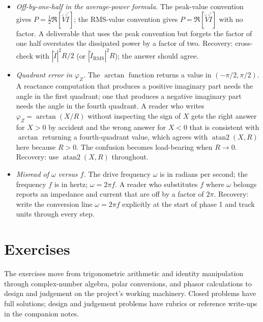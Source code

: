 \begin{project}
\begin{itemize}[leftmargin=*]
  \item \emph{Off-by-one-half in the average-power formula.} The
    peak-value convention gives $P = \tfrac{1}{2}\Re[\tilde V
    \bar{\tilde I}]$; the RMS-value convention gives
    $P = \Re[\tilde V \bar{\tilde I}]$ with no factor. A deliverable
    that uses the peak convention but forgets the factor of one
    half overstates the dissipated power by a factor of two.
    Recovery: cross-check with $|\tilde I|^{2} R / 2$ (or
    $|\tilde I_{\text{RMS}}|^{2} R$); the answer should agree.

  \item \emph{Quadrant error in $\varphi_{Z}$.} The
    $\arctan$ function returns a value in $(-\pi/2, \pi/2)$. A
    reactance computation that produces a positive imaginary part
    needs the angle in the first quadrant; one that produces a
    negative imaginary part needs the angle in the fourth quadrant.
    A reader who writes $\varphi_{Z} = \arctan(X/R)$ without
    inspecting the sign of $X$ gets the right answer for $X > 0$ by
    accident and the wrong answer for $X < 0$ that is consistent
    with $\arctan$ returning a fourth-quadrant value, which agrees
    with $\operatorname{atan2}(X, R)$ here because $R > 0$. The
    confusion becomes load-bearing when $R \to 0$. Recovery: use
    $\operatorname{atan2}(X, R)$ throughout.

  \item \emph{Misread of $\omega$ versus $f$.} The drive frequency
    $\omega$ is in radians per second; the frequency $f$ is in
    hertz; $\omega = 2\pi f$. A reader who substitutes $f$
    where $\omega$ belongs reports an impedance and current that
    are off by a factor of $2\pi$. Recovery: write the conversion
    line $\omega = 2\pi f$ explicitly at the start of phase 1 and
    track units through every step.
\end{itemize}
\end{project}

\section{Exercises}

The exercises move from trigonometric arithmetic and identity
manipulation through complex-number algebra, polar conversions,
and phasor calculations to design and judgement on the project's
working machinery. Closed problems have full solutions; design
and judgement problems have rubrics or reference write-ups in the
companion notes.

